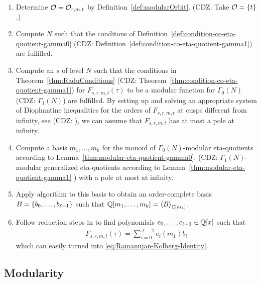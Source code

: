 \documentclass{article}
\begin{document}
\begin{enumerate}
\item Determine $\mathcal{O}=\modularOrbit{r,m,t}$ by
  Definition~\ref{def:modularOrbit}.
  (CDZ: Take $\mathcal{O}=\Set{t}$.)

\item Compute $N$ such that the conditons of
  Definition~\ref{def:condition-co-eta-quotient-gamma0}
  (CDZ: Definition~\ref{def:condition-co-eta-quotient-gamma1})
  are fulfilled.

\item Compute an  $s$ of level $N$ such
  that the conditions in Theorem~\ref{thm:RaduConditions}
  (CDZ: Theorem~\ref{thm:condition-co-eta-quotient-gamma1})
  for $F_{s,r,m,t}(\tau)$ to be a modular function for $\Gamma_0(N)$
  (CDZ: $\Gamma_1(N)$)
  are fulfilled. By setting up and solving an appropriate system of
  Diophantine inequalities for the orders of $F_{s,r,m,t}$ at cusps
  different from infinity, see
  \cite[Proposition~3.2.8]{Ligozat_CourbesModulaires_1975} (CDZ:
  \cite[Thm.~4]{Robins_GeneralizedDedekindEtaProducts_1994}), we can
  assume that $F_{s,r,m,t}$ has at most a pole at infinity.
\item Compute a basis $m_1,\ldots, m_k$ for the monoid of
  $\Gamma_0(N)$-modular eta-quotients according
  to Lemma~\ref{thm:modular-eta-quotient-gamma0}.
  (CDZ: $\Gamma_1(N)$-modular generalized eta-quotients according
  to Lemma~\ref{thm:modular-eta-quotient-gamma1} )
  with a pole at most at infinity.

\item Apply algorithm \algoSamba{}
  \cite{Hemmecke_DancingSambaRamanujan_2018} to this basis to obtain
  an order-complete basis $B=\Set{b_0,\ldots,b_{\ell-1}}$ such that
  $\setQ[m_1,\ldots,m_k] = \Module[{\setC[m_1]}]{B}$.

\item Follow reduction steps in
  \cite{Hemmecke_DancingSambaRamanujan_2018} to find polynomials
  $c_0,\ldots,c_{\ell-1} \in \setQ[x]$ such that
  \begin{gather*}
    F_{s,r,m,t}(\tau) = \sum_{i=0}^{\ell-1} c_i(m_1)b_i
  \end{gather*} which can easily turned into
  \eqref{eq:Ramanujan-Kolberg-Identity}.
\end{enumerate}



\subsection{Modularity}
\end{document}
